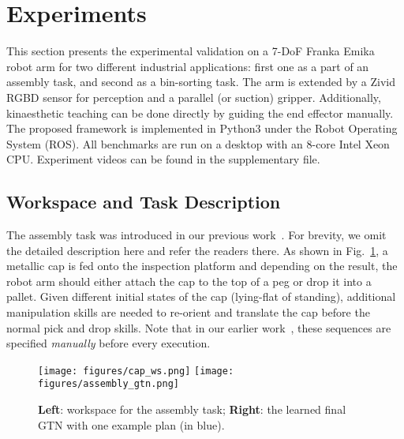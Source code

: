 \section{Experiments} \label{sec:experiments}
This section presents the experimental validation on a 7-DoF Franka Emika robot arm 
for two different industrial applications: 
first one as a part of an assembly task, and second as a bin-sorting task. 
The arm is extended by a Zivid RGBD sensor for perception 
and a parallel (or suction) gripper. 
Additionally, kinaesthetic teaching can be done directly by guiding the end effector manually. 
The proposed framework is implemented in Python3 under the Robot Operating System (ROS). 
All benchmarks are run on a desktop with an 8-core Intel Xeon CPU. 
Experiment videos can be found in the supplementary file. 


\subsection{Workspace and Task Description} \label{subsec:task-description}
The assembly task was introduced in our previous work~\cite{rozo2020learning}.
For brevity, we omit the detailed description here and refer the readers there.
As shown in Fig.~\ref{fig:assembly-gtn},  a metallic cap is fed onto the inspection platform 
and depending on the result, the robot arm should either attach the cap to the top of a peg 
or drop it into a pallet.
Given different initial states of the cap (lying-flat of standing), 
additional manipulation skills are needed to re-orient and translate the cap before the normal pick and drop skills. 
Note that in our earlier work~\cite{Schwenkel2019Optimizing, rozo2020learning}, 
these sequences are specified \emph{manually} before every execution.
\begin{figure}[t!]
    \centering
    \texttt{[image: figures/cap\_ws.png]}
    \texttt{[image: figures/assembly\_gtn.png]}
    \caption{\textbf{Left}: workspace for the assembly task; 
             \textbf{Right}: the learned final GTN with one example plan (in blue).}
    \label{fig:assembly-gtn}
    \vspace{-0.15cm}
\end{figure}

